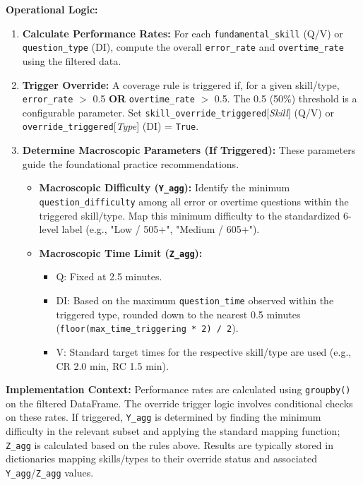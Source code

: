 \documentclass{article}
\begin{document}
\textbf{Operational Logic:}
\begin{enumerate}
    \item \textbf{Calculate Performance Rates:} For each \texttt{fundamental\_skill} (Q/V) or \texttt{question\_type} (DI), compute the overall \texttt{error\_rate} and \texttt{overtime\_rate} using the filtered data.
    \item \textbf{Trigger Override:} A coverage rule is triggered if, for a given skill/type, \texttt{error\_rate} $>$ 0.5 \textbf{OR} \texttt{overtime\_rate} $>$ 0.5. The 0.5 (50\%) threshold is a configurable parameter. Set \texttt{skill\_override\_triggered}[\textit{Skill}] (Q/V) or \texttt{override\_triggered}[\textit{Type}] (DI) = \texttt{True}. %
    \item \textbf{Determine Macroscopic Parameters (If Triggered):} These parameters guide the foundational practice recommendations.
    \begin{itemize}
        \item \textbf{Macroscopic Difficulty (\texttt{Y\_agg}):} Identify the minimum \texttt{question\_difficulty} among all error or overtime questions within the triggered skill/type. Map this minimum difficulty to the standardized 6-level label (e.g., "Low / 505+", "Medium / 605+").
        \item \textbf{Macroscopic Time Limit (\texttt{Z\_agg}):}
        \begin{itemize}
            \item Q: Fixed at 2.5 minutes.
            \item DI: Based on the maximum \texttt{question\_time} observed within the triggered type, rounded down to the nearest 0.5 minutes (\texttt{floor(max\_time\_triggering * 2) / 2}).
            \item V: Standard target times for the respective skill/type are used (e.g., CR 2.0 min, RC 1.5 min).
        \end{itemize}
    \end{itemize}
\end{enumerate}

\textbf{Implementation Context:} Performance rates are calculated using \texttt{groupby()} on the filtered DataFrame. The override trigger logic involves conditional checks on these rates. If triggered, \texttt{Y\_agg} is determined by finding the minimum difficulty in the relevant subset and applying the standard mapping function; \texttt{Z\_agg} is calculated based on the rules above. Results are typically stored in dictionaries mapping skills/types to their override status and associated \texttt{Y\_agg}/\texttt{Z\_agg} values.
\end{document}
